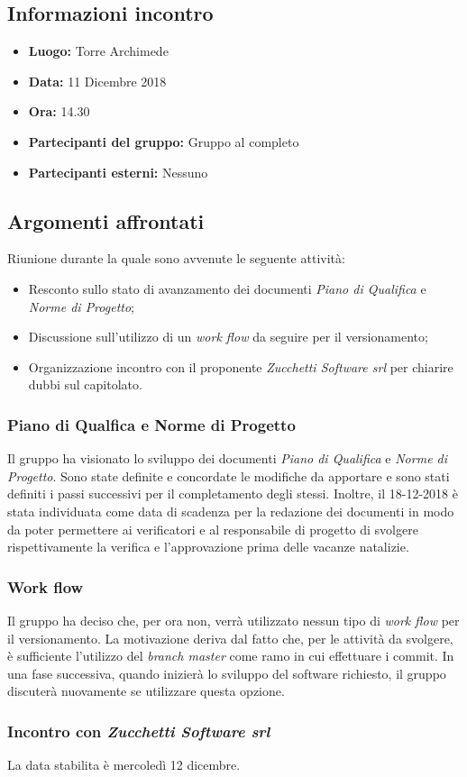 \subsection{Informazioni incontro}
\begin{itemize}
	\item { \textbf{Luogo:} Torre Archimede  }
	\item { \textbf{Data:} 11 Dicembre 2018 }
	\item { \textbf{Ora:} 14.30 }
	\item { \textbf{Partecipanti del gruppo:} Gruppo al completo }
	\item { \textbf{Partecipanti esterni:} Nessuno }
\end{itemize}


\subsection{Argomenti affrontati}
Riunione durante la quale sono avvenute le seguente attività:
\begin{itemize}
	\item{Resconto sullo stato di avanzamento dei documenti \emph{Piano di Qualifica} e \emph{Norme di Progetto}; }
	\item{Discussione sull'utilizzo di un \emph{work flow} da seguire per il versionamento;}
	\item{Organizzazione incontro con il proponente \emph{Zucchetti Software srl} per chiarire dubbi sul capitolato. }
\end{itemize}

\subsubsection{Piano di Qualfica e Norme di Progetto}
Il gruppo ha visionato lo sviluppo dei documenti \emph{Piano di Qualifica} e \emph{Norme di Progetto}. Sono state definite e concordate le modifiche da apportare e sono stati definiti i passi successivi per il completamento degli stessi. Inoltre, il 18-12-2018 è stata individuata come data di scadenza per la redazione dei documenti in modo da poter permettere ai verificatori e al responsabile di progetto di svolgere rispettivamente la verifica e l'approvazione prima delle vacanze natalizie.

\subsubsection{Work flow}
Il gruppo ha deciso che, per ora non, verrà utilizzato nessun tipo di \emph{work flow} per il versionamento. La motivazione deriva dal fatto che, per le attività da svolgere, è sufficiente l'utilizzo del \emph{branch master} come ramo in cui effettuare i commit. In una fase successiva, quando inizierà lo sviluppo del software richiesto, il gruppo discuterà nuovamente se utilizzare questa opzione.

\subsubsection{Incontro con \emph{Zucchetti Software srl}}
La data stabilita è mercoledì 12 dicembre.